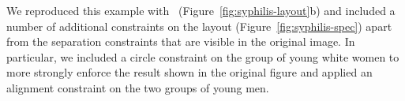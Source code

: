 
We reproduced this example with
\projectname~(Figure~\ref{fig:syphilis-layout}b) and included a number of
additional constraints on the layout (Figure~\ref{fig:syphilis-spec}) apart
from the separation constraints that are visible in the original image. In
particular, we included a circle constraint on the group of young white
women to more strongly enforce the result shown in the original figure and
applied an alignment constraint on the two groups of young
men. 

\subsection{}
